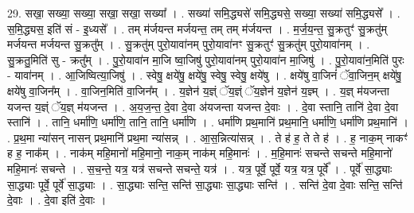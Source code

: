 \documentclass[17pt]{extarticle}
\begin{document}
29. सखा॒ सख्या॒ सख्या॒ सखा॒ सखा॒ सख्या᳚ । . सख्या॑ समि॒द्ध्यसे॑ समि॒द्ध्यसे॒ सख्या॒ सख्या॑ समि॒द्ध्यसे᳚ । . स॒मि॒द्ध्यस॒ इति॑ सं - इ॒ध्यसे᳚ । . तम् म॑र्जयन्त मर्जयन्त॒ तम् तम् म॑र्जयन्त । . म॒र्ज॒य॒न्त॒ सु॒क्रतुꣳ॑ सु॒क्रतु॑म् मर्जयन्त मर्जयन्त सु॒क्रतु᳚म् । . सु॒क्रतु॑म् पुरो॒यावा॑नम् पुरो॒यावा॑नꣳ सु॒क्रतुꣳ॑ सु॒क्रतु॑म् पुरो॒यावा॑नम् । . सु॒क्रतु॒मिति॑ सु - क्रतु᳚म् । . पु॒रो॒यावा॑न मा॒जि ष्वा॒जिषु॑ पुरो॒यावा॑नम् पुरो॒यावा॑न मा॒जिषु॑ । . पु॒रो॒यावा॑न॒मिति॑ पुरः - यावा॑नम् । . आ॒जिष्वित्या॒जिषु॑ । . स्वेषु॒ क्षये॑षु॒ क्षये॑षु॒ स्वेषु॒ स्वेषु॒ क्षये॑षु । . क्षये॑षु वा॒जिनं॑ ॅवा॒जिन॒म् क्षये॑षु॒ क्षये॑षु वा॒जिन᳚म् । . वा॒जिन॒मिति॑ वा॒जिन᳚म् । . य॒ज्ञेन॑ य॒ज्ञ्ं ॅय॒ज्ञ्ं ॅय॒ज्ञेन॑ य॒ज्ञेन॑ य॒ज्ञ्म् । . य॒ज्ञ् म॑यजन्ता यजन्त य॒ज्ञ्ं ॅय॒ज्ञ् म॑यजन्त । . अ॒य॒ज॒न्त॒ दे॒वा दे॒वा अ॑यजन्ता यजन्त दे॒वाः । . दे॒वा स्तानि॒ तानि॑ दे॒वा दे॒वा स्तानि॑ । . तानि॒ धर्मा॑णि॒ धर्मा॑णि॒ तानि॒ तानि॒ धर्मा॑णि । . धर्मा॑णि प्रथ॒मानि॑ प्रथ॒मानि॒ धर्मा॑णि॒ धर्मा॑णि प्रथ॒मानि॑ । . प्र॒थ॒मा न्या॑सन् नासन् प्रथ॒मानि॑ प्रथ॒मा न्या॑सन्न् । . आ॒स॒न्नित्या॑सन्न् । . ते ह॑ ह॒ ते ते ह॑ । . ह॒ नाक॒म् नाकꣳ॑ ह ह॒ नाक᳚म् । . नाक॑म् महि॒मानो॑ महि॒मानो॒ नाक॒म् नाक॑म् महि॒मानः॑ । . म॒हि॒मानः॑ सचन्ते सचन्ते महि॒मानो॑ महि॒मानः॑ सचन्ते । . स॒च॒न्ते॒ यत्र॒ यत्र॑ सचन्ते सचन्ते॒ यत्र॑ । . यत्र॒ पूर्वे॒ पूर्वे॒ यत्र॒ यत्र॒ पूर्वे᳚ । . पूर्वे॑ सा॒द्ध्याः सा॒द्ध्याः पूर्वे॒ पूर्वे॑ सा॒द्ध्याः । . सा॒द्ध्याः सन्ति॒ सन्ति॑ सा॒द्ध्याः सा॒द्ध्याः सन्ति॑ । . सन्ति॑ दे॒वा दे॒वाः सन्ति॒ सन्ति॑ दे॒वाः । . दे॒वा इति॑ दे॒वाः । \newline
\end{document}
